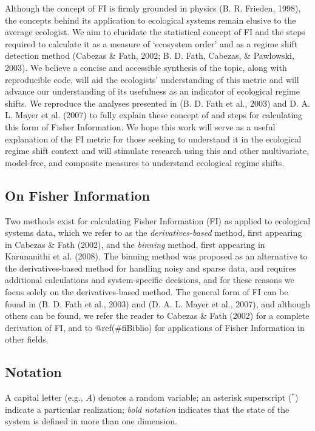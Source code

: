 \documentclass[12pt,twoside,openany]{reedthesis}
\begin{document}
Although the concept of FI is firmly grounded in physics (B. R. Frieden,
1998), the concepts behind its application to ecological systems remain
elusive to the average ecologist. We aim to elucidate the statistical
concept of FI and the steps required to calculate it as a measure of
`ecosystem order' and as a regime shift detection method (Cabezas \&
Fath, 2002; B. D. Fath, Cabezas, \& Pawlowski, 2003). We believe a
concise and accessible synthesis of the topic, along with reproducible
code, will aid the ecologists' understanding of this metric and will
advance our understanding of its usefulness as an indicator of
ecological regime shifts. We reproduce the analyses presented in (B. D.
Fath et al., 2003) and D. A. L. Mayer et al. (2007) to fully explain
these concept of and steps for calculating this form of Fisher
Information. We hope this work will serve as a useful explanation of the
FI metric for those seeking to understand it in the ecological regime
shift context and will stimulate research using this and other
multivariate, model-free, and composite measures to understand
ecological regime shifts.

\subsection{On Fisher Information}\label{on-fisher-information}

Two methods exist for calculating Fisher Information (FI) as applied to
ecological systems data, which we refer to as the
\emph{derivatives-based} method, first appearing in Cabezas \& Fath
(2002), and the \emph{binning} method, first appearing in Karunanithi et
al. (2008). The binning method was proposed as an alternative to the
derivatives-based method for handling noisy and sparse data, and
requires additional calculations and system-specific decisions, and for
these reasons we focus solely on the derivatives-based method. The
general form of FI can be found in (B. D. Fath et al., 2003) and (D. A.
L. Mayer et al., 2007), and although others can be found, we refer the
reader to Cabezas \& Fath (2002) for a complete derivation of FI, and to
@ref(\#fiBiblio) for applications of Fisher Information in other fields.

\subsection{Notation}\label{notation}

A capital letter (e.g., \(A\)) denotes a random variable; an asterisk
superscript (\(^*\)) indicate a particular realization; \emph{bold
notation} indicates that the state of the system is defined in more than
one dimension.
\end{document}
